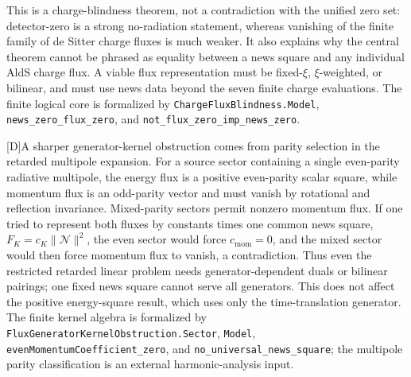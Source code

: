 \documentclass[11pt,a4paper]{article}
\newcommand{\statusD}{\textsf{[D]}}
\begin{document}
This is a charge-blindness theorem, not a contradiction with the unified zero set: detector-zero is a strong no-radiation statement, whereas vanishing of the finite family of de Sitter charge fluxes is much weaker.  It also explains why the central theorem cannot be phrased as equality between a news square and any individual AldS charge flux.  A viable flux representation must be fixed-\(\xi\), \(\xi\)-weighted, or bilinear, and must use news data beyond the seven finite charge evaluations.  The finite logical core is formalized by \texttt{ChargeFluxBlindness.Model}, \texttt{news\_zero\_flux\_zero}, and \texttt{not\_flux\_zero\_imp\_news\_zero}.

\statusD A sharper generator-kernel obstruction comes from parity selection in the retarded multipole expansion.  For a source sector containing a single even-parity radiative multipole, the energy flux is a positive even-parity scalar square, while momentum flux is an odd-parity vector and must vanish by rotational and reflection invariance.  Mixed-parity sectors permit nonzero momentum flux.  If one tried to represent both fluxes by constants times one common news square, \(F_K=c_K\|\mathcal N\|^2\), the even sector would force \(c_{\mathrm{mom}}=0\), and the mixed sector would then force momentum flux to vanish, a contradiction.  Thus even the restricted retarded linear problem needs generator-dependent duals or bilinear pairings; one fixed news square cannot serve all generators.  This does not affect the positive energy-square result, which uses only the time-translation generator.  The finite kernel algebra is formalized by \texttt{FluxGeneratorKernelObstruction.Sector}, \texttt{Model}, \texttt{evenMomentumCoefficient\_zero}, and \texttt{no\_universal\_news\_square}; the multipole parity classification is an external harmonic-analysis input.
\end{document}

